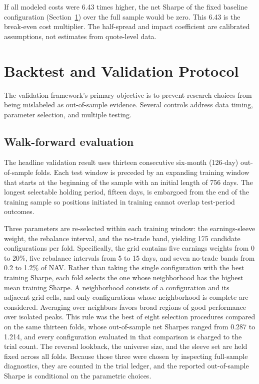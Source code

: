 \documentclass[11pt]{article}
\begin{document}
If all modeled costs were 6.43 times higher, the net Sharpe of the fixed baseline configuration (Section~\ref{sec:validation}) over the full sample would be zero. This 6.43 is the break-even cost multiplier. The half-spread and impact coefficient are calibrated assumptions, not estimates from quote-level data.

\section{Backtest and Validation Protocol}
\label{sec:validation}

The validation framework's primary objective is to prevent research choices from being mislabeled as out-of-sample evidence. Several controls address data timing, parameter selection, and multiple testing.

\subsection{Walk-forward evaluation}

The headline validation result uses thirteen consecutive six-month (126-day) out-of-sample folds. Each test window is preceded by an expanding training window that starts at the beginning of the sample with an initial length of 756 days. The longest selectable holding period, fifteen days, is embargoed from the end of the training sample so positions initiated in training cannot overlap test-period outcomes.

Three parameters are re-selected within each training window: the earnings-sleeve weight, the rebalance interval, and
the no-trade band, yielding 175 candidate configurations per fold. Specifically, the grid contains five
earnings weights from 0 to 20\%, five rebalance intervals from 5 to 15 days, and seven no-trade bands from 0.2 to 1.2\%
of NAV. Rather than taking the single configuration with the best training Sharpe, each fold selects the one whose
neighborhood has the highest mean training Sharpe. A neighborhood consists of a configuration and its
adjacent grid cells, and only configurations whose neighborhood is complete are considered. Averaging over neighbors
favors broad regions of good performance over isolated peaks. This rule was the best of eight selection
procedures compared on the same thirteen folds, whose out-of-sample net Sharpes ranged from 0.287 to 1.214, and every
configuration evaluated in that comparison is charged to the trial count. The reversal
lookback, the universe size, and the sleeve set are held fixed across all folds. Because those three were chosen
by inspecting full-sample diagnostics, they are counted in the trial ledger, and the reported out-of-sample Sharpe is conditional on the parametric choices.
\end{document}
